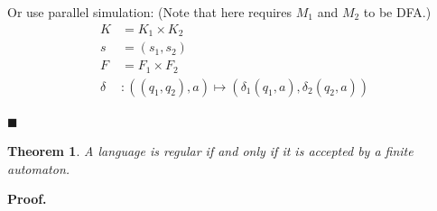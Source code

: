 \documentclass[aps,pra,onecolumn,notitlepage,superscriptaddress]{revtex4-1}
\newtheorem{theo}{Theorem}
\def\Proof{{\bf Proof.~}}
\def\qed{$\blacksquare$ \newline}
\begin{document}
\begin{enumerate}
        Or use parallel simulation: (Note that here requires $M_1$ and $M_2$ to be DFA.)
        \begin{align*}
            K &= K_1 \times K_2 \\
            s &= (s_1, s_2) \\
            F &= F_1 \times F_2 \\
            \delta &: ((q_1,q_2),a) \mapsto (\delta_1(q_1,a), \delta_2(q_2,a))
        \end{align*}
    \end{enumerate}
    \qed

    \begin{theo}
        A language is regular if and only if it is accepted by a finite automaton.
    \end{theo}
    
    
    \Proof 
\end{document}
